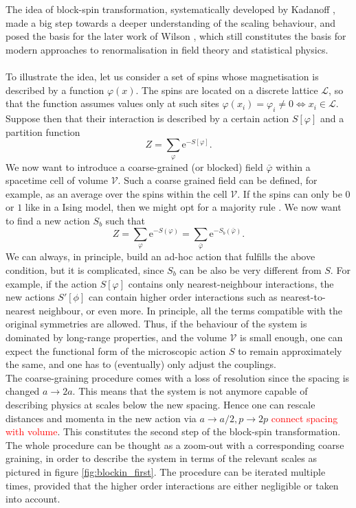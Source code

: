 The idea of block-spin transformation, systematically developed by Kadanoff \cite{PhysicsPhysiqueFizika_2_263}, made a big step towards a deeper understanding of the scaling behaviour, and posed the basis for the later work of Wilson \cite{WilsonRG1,WilsonRG2,WilsonFisher}, which still constitutes the basis for modern approaches to renormalisation in field theory and statistical physics.\\~\\
To illustrate the idea, let us consider a set of spins whose magnetisation is described by a function $\varphi(x)$. The spins are located on a discrete lattice $\mathscr{L}$, so that the function assumes values only at such sites $\varphi(x_i) = \varphi_i \neq 0 \Leftrightarrow x_i \in \mathscr{L}$. Suppose then that their interaction is described by a certain action $S[\varphi]$ and a partition function
\begin{equation*}
    Z=\sum_{\varphi} \mathrm{e}^{-S[\varphi]}.
\end{equation*}
We now want to introduce a coarse-grained (or blocked) field $\bar\varphi$ within a spacetime cell of volume $\mathcal{V}$. Such a coarse grained field can be defined, for example, as an average over the spins within the cell $\mathcal{V}$. If the spins can only be $0$ or $1$ like in a Ising model, then we might opt for a majority rule \cite{cardy_1996}.
We now want to find a new action $S_b$ such that 
\begin{equation}
    Z=\sum_{\varphi} \mathrm{e}^{-S(\varphi)}= \sum_{\bar\varphi} \mathrm{e}^{-S_b\left(\bar\varphi\right)}.
\end{equation}
We can always, in principle, build an ad-hoc action that fulfills the above condition, but it is complicated, since $S_b$ can be also be very different from $S$. For example, if the action $S[\varphi]$ contains only nearest-neighbour interactions, the new actions $S'[\phi]$ can contain higher order interactions such as nearest-to-nearest neighbour, or even more. In principle, all the terms compatible with the original symmetries are allowed. 
Thus, if the behaviour of the system is dominated by long-range properties, and the volume $\mathcal{V}$ is small enough, one can expect the functional form of the microscopic action $S$ to remain approximately the same, and one has to (eventually) only adjust the couplings. \\
The coarse-graining procedure comes with a loss of resolution since the spacing is changed $a \to 2a$. This means that the system is not anymore capable of describing physics at scales below the new spacing. Hence one can rescale distances and momenta in the new action via $a \to a/2, p \to 2p$ \textcolor{red}{connect spacing with volume}. This constitutes the second step of the block-spin transformation. The whole procedure can be thought as a zoom-out with a corresponding coarse graining, in order to describe the system in terms of the relevant scales as pictured in figure \ref{fig:blockin_first}. The procedure can be iterated multiple times, provided that the higher order interactions are either negligible or taken into account. \\


